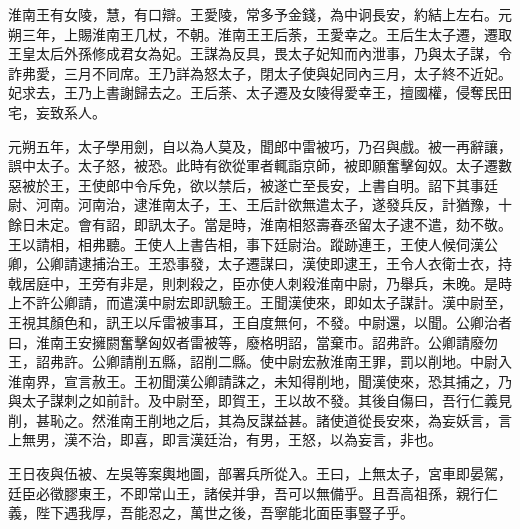 淮南王有女陵，慧，有口辯。王愛陵，常多予金錢，為中诇長安，約結上左右。元朔三年，上賜淮南王几杖，不朝。淮南王王后荼，王愛幸之。王后生太子遷，遷取王皇太后外孫修成君女為妃。王謀為反具，畏太子妃知而內泄事，乃與太子謀，令詐弗愛，三月不同席。王乃詳為怒太子，閉太子使與妃同內三月，太子終不近妃。妃求去，王乃上書謝歸去之。王后荼、太子遷及女陵得愛幸王，擅國權，侵奪民田宅，妄致系人。

元朔五年，太子學用劍，自以為人莫及，聞郎中雷被巧，乃召與戲。被一再辭讓，誤中太子。太子怒，被恐。此時有欲從軍者輒詣京師，被即願奮擊匈奴。太子遷數惡被於王，王使郎中令斥免，欲以禁后，被遂亡至長安，上書自明。詔下其事廷尉、河南。河南治，逮淮南太子，王、王后計欲無遣太子，遂發兵反，計猶豫，十餘日未定。會有詔，即訊太子。當是時，淮南相怒壽春丞留太子逮不遣，劾不敬。王以請相，相弗聽。王使人上書告相，事下廷尉治。蹤跡連王，王使人候伺漢公卿，公卿請逮捕治王。王恐事發，太子遷謀曰，漢使即逮王，王令人衣衛士衣，持戟居庭中，王旁有非是，則刺殺之，臣亦使人刺殺淮南中尉，乃舉兵，未晚。是時上不許公卿請，而遣漢中尉宏即訊驗王。王聞漢使來，即如太子謀計。漢中尉至，王視其顏色和，訊王以斥雷被事耳，王自度無何，不發。中尉還，以聞。公卿治者曰，淮南王安擁閼奮擊匈奴者雷被等，廢格明詔，當棄市。詔弗許。公卿請廢勿王，詔弗許。公卿請削五縣，詔削二縣。使中尉宏赦淮南王罪，罰以削地。中尉入淮南界，宣言赦王。王初聞漢公卿請誅之，未知得削地，聞漢使來，恐其捕之，乃與太子謀刺之如前計。及中尉至，即賀王，王以故不發。其後自傷曰，吾行仁義見削，甚恥之。然淮南王削地之后，其為反謀益甚。諸使道從長安來，為妄妖言，言上無男，漢不治，即喜，即言漢廷治，有男，王怒，以為妄言，非也。

王日夜與伍被、左吳等案輿地圖，部署兵所從入。王曰，上無太子，宮車即晏駕，廷臣必徵膠東王，不即常山王，諸侯并爭，吾可以無備乎。且吾高祖孫，親行仁義，陛下遇我厚，吾能忍之，萬世之後，吾寧能北面臣事豎子乎。

